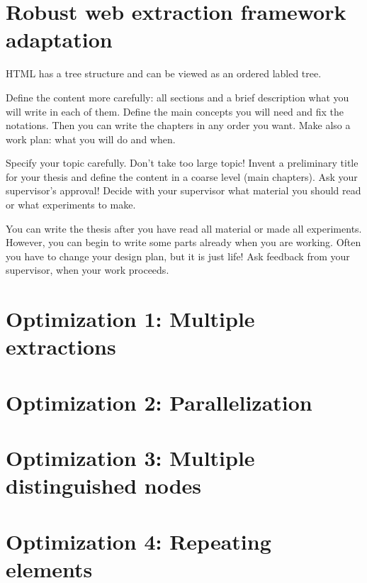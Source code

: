 \chapter{Robust web extraction framework adaptation}

HTML has a tree structure and can be viewed as an ordered labled tree.

Define the content more carefully: all sections and a brief description what you will write in each of them. Define the main concepts you will need and fix the notations. Then you can write the chapters in any order you want. Make also a work plan: what you will do and when.

Specify your topic carefully. Don’t take too large topic!  Invent a preliminary title for your thesis and define the content in a coarse level (main chapters). Ask your supervisor’s approval! Decide with your supervisor what material you should read or what experiments to make.  

You can write the thesis after you have read all material or made all experiments. However, you can begin to write some parts already when you are working. Often you have to change your design plan, but it is just life! Ask feedback from your supervisor, when your work proceeds.

\chapter{Optimization 1: Multiple extractions}
\chapter{Optimization 2: Parallelization}
\chapter{Optimization 3: Multiple distinguished nodes}
\chapter{Optimization 4: Repeating elements}

